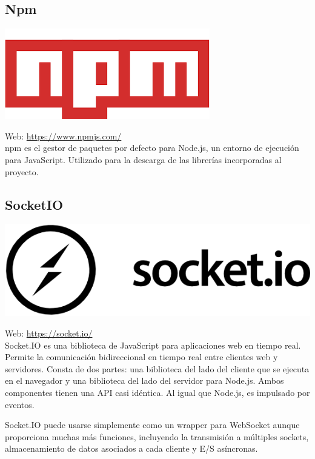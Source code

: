 \subsection{Npm}

\begin{center}
\includegraphics[scale=0.4]{imagenes/npm-logo.png}
\end{center}

Web: \url{https://www.npmjs.com/}\\

npm es el gestor de paquetes por defecto para Node.js, un entorno de ejecución para JavaScript. Utilizado para la descarga de las librerías incorporadas al proyecto.


\subsection{SocketIO}

\begin{center}
\includegraphics[scale=0.3]{imagenes/socketio-logo.png}
\end{center}

Web: \url{https://socket.io/}\\

Socket.IO es una biblioteca de JavaScript para aplicaciones web en tiempo real. Permite la comunicación bidireccional en tiempo real entre clientes web y servidores. Consta de dos partes: una biblioteca del lado del cliente
que se ejecuta en el navegador y una biblioteca del lado del servidor para Node.js. Ambos componentes tienen una API casi idéntica. Al igual que Node.js, es impulsado por eventos.

Socket.IO puede usarse simplemente como un wrapper para WebSocket aunque proporciona muchas más funciones, incluyendo la transmisión a múltiples sockets, almacenamiento de datos asociados a cada cliente y E/S asíncronas.


